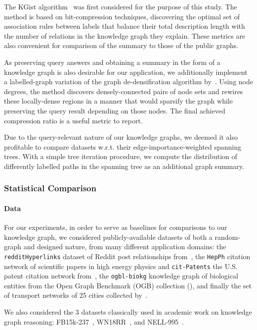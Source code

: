 The KGist algorithm~\cite{belth_what_2020} was first considered for the purpose of this study. The method is based on bit-compression techniques, discovering the optimal set of association rules between labels that balance their total description length with the number of relations in the knowledge graph they explain. These metrics are also convenient for comparison of the summary to those of the public graphs.

As preserving query answers and obtaining a summary in the form of a knowledge graph is also desirable for our application, we additionally implement a labelled-graph variation of the graph de-densification algorithm by~\cite{maccioni_scalable_2016}. Using node degrees, the method discovers densely-connected pairs of node sets and rewires these locally-dense regions in a manner that would sparsify the graph while preserving the query result depending on those nodes. The final achieved compression ratio is a useful metric to report. 

Due to the query-relevant nature of our knowledge graphs, we deemed it also profitable to compare datasets w.r.t. their edge-importance-weighted spanning trees. With a simple tree iteration procedure, we compute the distribution of differently labelled paths in the spanning tree as an additional graph summary.

\subsubsection{Statistical Comparison}

\paragraph{Data} For our experiments, in order to serve as baselines for comparisons to our knowledge graph, we considered publicly-available datasets of both a random-graph and designed nature, from many different application domains: the \texttt{redditHyperlinks} dataset of Reddit post relationships from~\cite{kumar_community_2018}, the \texttt{HepPh} citation network of scientific papers in high energy physics and \texttt{cit-Patents} the U.S. patent citation network from~\cite{leskovec_graphs_2005}, the \texttt{ogbl-biokg} knowledge graph of biological entities from the Open Graph Benchmark (OGB) collection (\cite{hu_open_2021}), and finally the set of transport networks of 25 cities collected by~\cite{kujala_collection_2018}.

We also considered the 3 datasets classically used in academic work on knowledge graph reasoning: FB15k-237~\cite{toutanova_observed_2015}, WN18RR~\cite{dettmers_convolutional_2018}, and NELL-995~\cite{xiong_deeppath_2017}.

